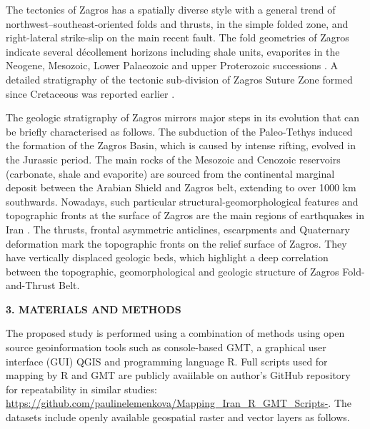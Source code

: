 \documentclass[12pt,a4paper,oneside]{article}
\def \newsection{\vspace{12pt}\textbf}
\def \newpar{\vspace{6pt}}
\begin{document}
\newpar The tectonics of Zagros has a spatially diverse style with a general trend of northwest--southeast-oriented folds and thrusts, in the simple folded zone, and right-lateral strike-slip on the main recent fault. The fold geometries of Zagros indicate several décollement horizons including shale units, evaporites in the Neogene, Mesozoic, Lower Palaeozoic and upper Proterozoic successions \citep{Blanc}. A detailed stratigraphy of the tectonic sub-division of Zagros Suture Zone formed since Cretaceous was reported earlier \citep{Ali2014,Authemayou,Ali2012}. 

\newpar The geologic stratigraphy of Zagros mirrors major steps in its evolution that can be briefly characterised as follows. The subduction of the Paleo-Tethys induced the formation of the Zagros Basin, which is caused by intense rifting, evolved in the Jurassic period. The main rocks of the Mesozoic and Cenozoic reservoirs (carbonate, shale and evaporite) are sourced from the continental marginal deposit between the Arabian Shield and Zagros belt, extending to over 1000 km southwards. Nowadays, such particular structural-geomorphological features and topographic fronts at the surface of Zagros are the main regions of earthquakes in Iran \citep{Berberian}. The thrusts, frontal asymmetric anticlines, escarpments and Quaternary deformation mark the topographic fronts on the relief surface of Zagros. They have vertically displaced geologic beds, which highlight a deep correlation between the topographic, geomorphological and geologic structure of Zagros Fold-and-Thrust Belt.

\newsection {3. MATERIALS AND METHODS}

\newpar The proposed study is performed using a combination of methods using open source geoinformation tools such as console-based GMT, a graphical user interface (GUI) QGIS and programming language R. Full scripts used for mapping by R and GMT are publicly avaiilable on author's GitHub repository for repeatability in similar studies: \href{https://github.com/paulinelemenkova/Mapping_Iran_R_GMT_Scripts-}{https://github.com/paulinelemenkova/Mapping\_Iran\_R\_GMT\_Scripts-}. The datasets include openly available geospatial raster and vector layers as follows. 
\end{document}
